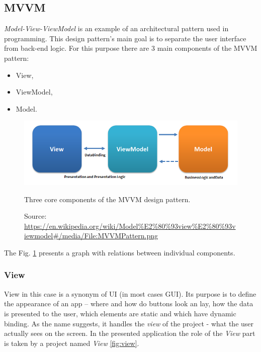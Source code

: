 \subsection{MVVM}
    \textit{Model-View-ViewModel} is an example of an architectural pattern used in programming. This design pattern's main goal is to separate the user interface from back-end logic. For this purpose there are 3 main components of the MVVM pattern:
    \begin{itemize}
        \item View,
        \item ViewModel,
        \item Model.
    \end{itemize}
    
    \begin{figure}[H]
        \centering
        \includegraphics[width=\textwidth]{img/MVVMPattern.png}
        \caption{Three core components of the MVVM design pattern.}
        \label{fig:mvvm_pattern}
        \caption*{Source: \url{https://en.wikipedia.org/wiki/Model\%E2\%80\%93view\%E2\%80\%93viewmodel\#/media/File:MVVMPattern.png}}
    \end{figure}
    The Fig. \ref{fig:mvvm_pattern} presents a graph with relations between individual components.
    
    \subsubsection{View}
        View in this case is a synonym of UI (in most cases GUI). Its purpose is to define the appearance of an app -- where and how do buttons look an lay, how the data is presented to the user, which elements are static and which have dynamic binding. As the name suggests, it handles the \textit{view} of the project - what the user actually sees on the screen.
        In the presented application the role of the \textit{View} part is taken by a project named \textit{View} \ref{fig:view}.
        
